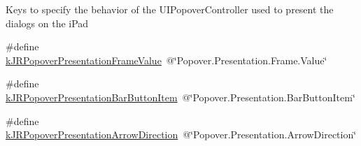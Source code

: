 Keys to specify the behavior of the UIPopoverController used to present the dialogs on the iPad \begin{DoxyCompactItemize}
\item 
\#define \hyperlink{group__custom_interface_ga487550fb53295a3b536f6d233d221aca}{kJRPopoverPresentationFrameValue}~@\char`\"{}Popover.Presentation.Frame.Value\char`\"{}
\item 
\#define \hyperlink{group__custom_interface_ga6b597e0a293938c07e5f36cd88da5a71}{kJRPopoverPresentationBarButtonItem}~@\char`\"{}Popover.Presentation.BarButtonItem\char`\"{}
\item 
\#define \hyperlink{group__custom_interface_gafe8ed9543a8bd4a8ef872f77bce583c5}{kJRPopoverPresentationArrowDirection}~@\char`\"{}Popover.Presentation.ArrowDirection\char`\"{}
\end{DoxyCompactItemize}
